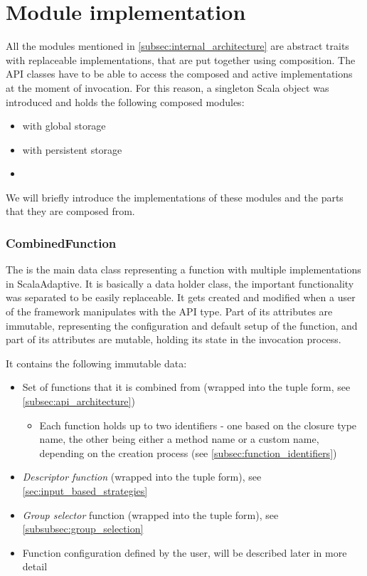\section{Module implementation}
\label{sec:module_impl}

All the modules mentioned in \ref{subsec:internal_architecture} are abstract traits with replaceable implementations, that are put together using composition. The API classes have to be able to access the composed and active implementations at the moment of invocation. For this reason, a singleton Scala object  was introduced and holds the following composed modules:

\begin{itemize}
	\item {} with global storage
	\item {} with persistent storage
	\item {}
\end{itemize}

We will briefly introduce the implementations of these modules and the parts that they are composed from.

\subsubsection{CombinedFunction}

The  is the main data class representing a function with multiple implementations in ScalaAdaptive. It is basically a data holder class, the important functionality was separated to be easily replaceable. It gets created and modified when a user of the framework manipulates with the  API type. Part of its attributes are immutable, representing the configuration and default setup of the function, and part of its attributes are mutable, holding its state in the invocation process.

It contains the following immutable data:

\begin{itemize}
	\item Set of functions that it is combined from (wrapped into the tuple form, see \ref{subsec:api_architecture})
	\begin{itemize}
		\item	Each function holds up to two identifiers - one based on the closure type name, the other being either a method name or a custom name, depending on the creation process (see \ref{subsec:function_identifiers})
	\end{itemize}
	\item \textit{Descriptor function} (wrapped into the tuple form), see \ref{sec:input_based_strategies}
	\item \textit{Group selector} function (wrapped into the tuple form), see \ref{subsubsec:group_selection}
	\item Function configuration defined by the user, will be described later in more detail
\end{itemize}

